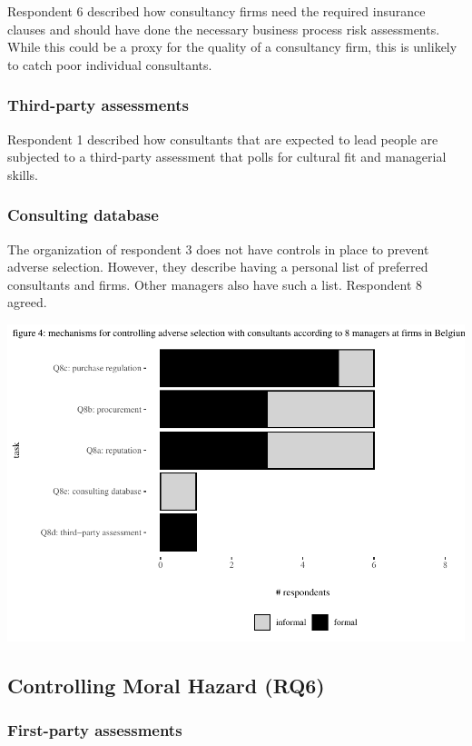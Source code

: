 \documentclass[12pt]{article}
\begin{document}
Respondent 6 described how consultancy firms need the required insurance
clauses and should have done the necessary business process risk
assessments. While this could be a proxy for the quality of a
consultancy firm, this is unlikely to catch poor individual consultants.

\subsubsection{Third-party assessments}\label{third-party-assessments-1}

Respondent 1 described how consultants that are expected to lead people
are subjected to a third-party assessment that polls for cultural fit
and managerial skills.

\subsubsection{Consulting database}\label{consulting-database-1}

The organization of respondent 3 does not have controls in place to
prevent adverse selection. However, they describe having a personal list
of preferred consultants and firms. Other managers also have such a
list. Respondent 8 agreed.

\begin{center}\includegraphics[width=0.75\linewidth]{2_ams_five_pager_files/figure-latex/unnamed-chunk-6-1} \end{center}

\subsection{Controlling Moral Hazard
(RQ6)}\label{controlling-moral-hazard-rq6}

\subsubsection{First-party assessments}\label{first-party-assessments-1}
\end{document}
